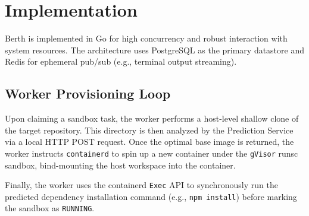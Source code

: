 \section{Implementation}

Berth is implemented in Go for high concurrency and robust interaction with system resources. The architecture uses PostgreSQL as the primary datastore and Redis for ephemeral pub/sub (e.g., terminal output streaming).

\subsection{Worker Provisioning Loop}
Upon claiming a sandbox task, the worker performs a host-level shallow clone of the target repository. This directory is then analyzed by the Prediction Service via a local HTTP POST request. Once the optimal base image is returned, the worker instructs \texttt{containerd} to spin up a new container under the \texttt{gVisor} runsc sandbox, bind-mounting the host workspace into the container.

Finally, the worker uses the containerd \texttt{Exec} API to synchronously run the predicted dependency installation command (e.g., \texttt{npm install}) before marking the sandbox as \texttt{RUNNING}.
